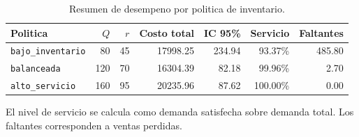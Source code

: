 \begin{table}[htbp]
\centering
\caption{Resumen de desempeno por politica de inventario.}
\label{tab:inventario-resumen-politicas}
\begin{tabular}{lrrrrrr}
\toprule
Politica & $Q$ & $r$ & Costo total & IC 95\% & Servicio & Faltantes \\
\midrule
\texttt{bajo\_inventario} & 80 & 45 & 17998.25 & 234.94 & 93.37\% & 485.80 \\
\texttt{balanceada} & 120 & 70 & 16304.39 & 82.18 & 99.96\% & 2.70 \\
\texttt{alto\_servicio} & 160 & 95 & 20235.96 & 87.62 & 100.00\% & 0.00 \\
\bottomrule
\end{tabular}
\par\smallskip
\begin{minipage}{0.95\linewidth}
\centering\footnotesize
El nivel de servicio se calcula como demanda satisfecha sobre demanda total. Los faltantes corresponden a ventas perdidas.
\end{minipage}
\end{table}
